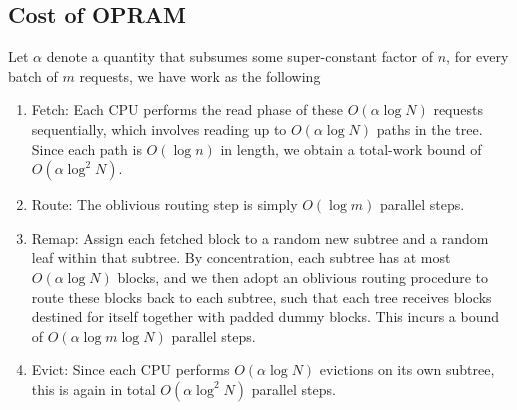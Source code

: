 \subsection{Cost of OPRAM}
  Let  $\alpha$ denote a quantity that subsumes some super-constant factor of $n$,
  for every batch of $m$ requests, we have work as the following \begin{enumerate}
  	\item Fetch: Each CPU performs the read phase of these $O(\alpha \log N )$ requests sequentially, which involves reading up to $O(\alpha \log N )$ paths in the tree. Since each path is $O(\log n)$ in length, we obtain a total-work bound of $O(\alpha \log^2 N)$.
  	\item Route: The oblivious routing step is simply $O(\log m)$ parallel steps.
  	\item Remap: Assign each fetched block to a random new subtree and a random leaf within that subtree. By concentration, each subtree has at most $O(\alpha \log N) $ blocks, and we then adopt an oblivious routing procedure to route these blocks back to each subtree, such that each tree receives blocks destined for itself together with padded dummy blocks. This incurs a bound of $O(\alpha \log m \log N)$ parallel steps.
  	\item Evict: Since each CPU performs $O(\alpha \log N)$  evictions on its own subtree, this is again in total $O(\alpha \log^2 N)$ parallel steps.
  \end{enumerate}
   
       
   
   